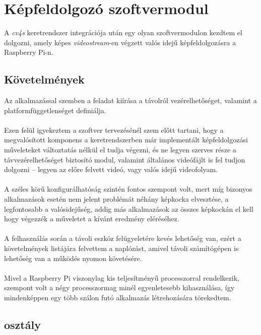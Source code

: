 \chapter{Képfeldolgozó szoftvermodul}

A \emph{cv4s} keretrendszer integrációja után egy olyan szoftvermodulon kezdtem el dolgozni, amely képes \textit{videostream}-en végzett valós idejű képfeldolgozásra a Raspberry Pi-n. 

\section{Követelmények}

Az alkalmazással szemben a feladat kiírása a távolról vezérelhetőséget, valamint a platformfüggetlenséget definiálja. \\
\\
Ezen felül igyekeztem a szoftver tervezésénél szem előtt tartani, hogy a megvalósított komponens a keretrendszerben már implementált képfeldolgozási műveleteket változtatás nélkül el tudja végezni, és ne legyen szerves része a távvezérelhetőséget biztosító modul, valamint általános videófájlt is fel tudjon dolgozni -- legyen az előre felvett videó, vagy valós idejű videofolyam.\\
\\
A széles körű konfigurálhatóság szintén fontos szempont volt, mert míg bizonyos alkalmazások esetén nem jelent problémát néhány képkocka elvesztése, a legfontosabb a valósidejűség, addig más alkalmazások az összes képkockán el kell hogy végezzék a műveletet a kívánt eredmény eléréséhez.\\
\\
A felhasználás során a távoli eszköz felügyeletére kevés lehetőség van, ezért a követelmények listájára felvettem a naplózást, amivel távoli számítógépen is lehetőség van a működés nyomon követésére.\\
\\
Mivel a Raspberry Pi viszonylag kis teljesítményű processzorral rendelkezik, szempont volt a négy processzormag minél egyenletesebb kihasználása, így mindenképpen egy több szálon futó alkalmazás létrehozására törekedtem.

\section{ osztály}

